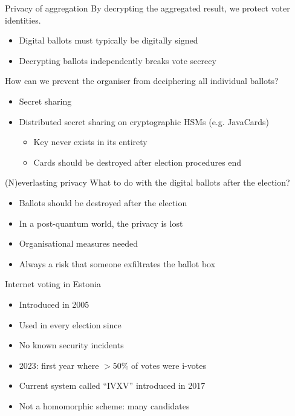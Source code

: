 \begin{frame}{Privacy of aggregation}
  By decrypting the aggregated result, we protect voter identities.
  \begin{itemize}[<+(1)->]
    \item Digital ballots must typically be digitally signed
    \item Decrypting ballots independently breaks vote secrecy
  \end{itemize}

  \vspace*{1em}

  \pause
  How can we prevent the organiser from deciphering all individual ballots?
  \begin{itemize}[<+(1)->]
    \item Secret sharing
    \item Distributed secret sharing on cryptographic HSMs (e.g. JavaCards)
    \begin{itemize}
      \item Key never exists in its entirety
      \item Cards should be destroyed after election procedures end
    \end{itemize}
  \end{itemize} 
\end{frame}

\begin{frame}{(N)everlasting privacy}
  What to do with the digital ballots after the election?
  \begin{itemize}[<+(1)->]
    \item Ballots should be destroyed after the election
    \item In a post-quantum world, the privacy is lost
    \item Organisational measures needed
    \item Always a risk that someone exfiltrates the ballot box
  \end{itemize}
\end{frame}

\begin{frame}{Internet voting in Estonia}
  \begin{itemize}[<+(1)->]
    \item Introduced in 2005
    \item Used in every election since
    \item No known security incidents
    \item 2023: first year where $> 50\%$ of votes were i-votes
    \item Current system called \enquote{IVXV} introduced in 2017
    \item Not a homomorphic scheme: many candidates
  \end{itemize}
\end{frame}

